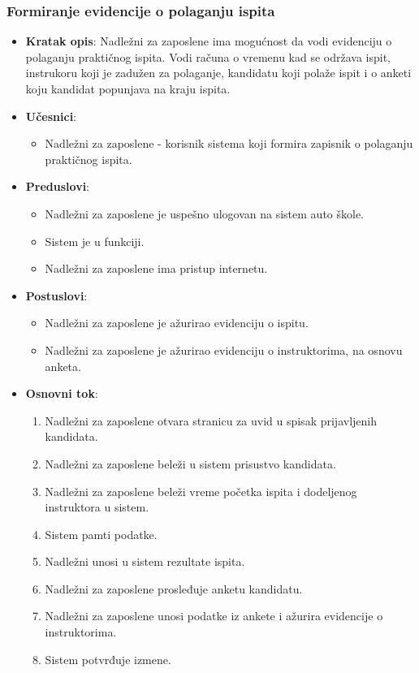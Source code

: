 \subsubsection{Formiranje evidencije o polaganju ispita}
\label{subsubsec:vozni park}
\begin{itemize}
  \item \textbf{Kratak opis}: Nadležni za zaposlene ima mogućnost da vodi evidenciju o polaganju praktičnog ispita. 
  Vodi računa o vremenu kad se održava ispit, instrukoru koji je zadužen za polaganje, kandidatu koji polaže ispit i o anketi koju kandidat popunjava na kraju ispita.

  \item \textbf{Učesnici}:
    \begin{itemize}
    \item Nadležni za zaposlene - korisnik sistema koji formira zapisnik o polaganju praktičnog ispita.
    \end{itemize}
  \item \textbf{Preduslovi}:
    \begin{itemize}
    \item  Nadležni za zaposlene je uspešno ulogovan na sistem auto škole.
    \item  Sistem je u funkciji.
    \item  Nadležni za zaposlene ima pristup internetu.
    \end{itemize}
  \item \textbf{Postuslovi}:
      \begin{itemize}
      \item  Nadležni za zaposlene je ažurirao evidenciju o ispitu.
      \item  Nadležni za zaposlene je ažurirao evidenciju o instruktorima, na osnovu anketa.
      \end{itemize}
  \item \textbf{Osnovni tok}:
      \begin{enumerate}
        \item Nadležni za zaposlene otvara stranicu za uvid u spisak prijavljenih kandidata.
        \item Nadležni za zaposlene beleži u sistem prisustvo kandidata.
        \item Nadležni za zaposlene beleži vreme početka ispita i dodeljenog instruktora u sistem.
        \item Sistem pamti podatke.
        \item Nadležni unosi u sistem rezultate ispita.
        \item Nadležni za zaposlene prosleđuje anketu kandidatu.
        \item Nadležni za zaposlene unosi podatke iz ankete i ažurira evidencije o instruktorima.
        \item Sistem potvrđuje izmene.
      \end{enumerate}


\end{itemize}
